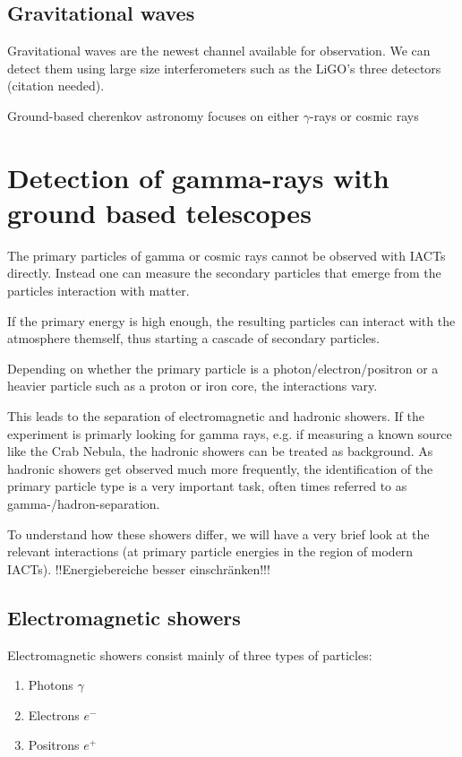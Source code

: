 \subsection{Gravitational waves}
Gravitational waves are the newest channel available for observation.
We can detect them using large size interferometers such as
the LiGO's three detectors (citation needed).



Ground-based cherenkov astronomy focuses on either $\gamma$-rays or cosmic rays


\section{Detection of gamma-rays with ground based telescopes}
The primary particles of gamma or cosmic rays cannot be 
observed with IACTs directly. Instead one can measure the secondary particles
that emerge from the particles interaction with matter.

If the primary energy is high enough, the resulting 
particles can interact with the atmosphere themself, thus starting a 
cascade of secondary particles.

Depending on whether the primary particle is 
a photon/electron/positron or a heavier particle such as a proton 
or iron core, the interactions vary.

This leads to the separation of electromagnetic and hadronic showers.
If the experiment is primarly looking for 
gamma rays, e.g. if measuring a known source like the Crab Nebula, 
the hadronic showers can be treated as background.
As hadronic showers get observed much more frequently, 
the identification of the primary particle type is a very important 
task, often times referred to as gamma-/hadron-separation.

To understand how these showers differ, we will have a very brief look
at the relevant interactions (at primary particle energies in the 
region of modern IACTs).
!!Energiebereiche besser einschränken!!!


\subsection{Electromagnetic showers}
Electromagnetic showers consist mainly of three types of particles:
\begin{enumerate}
	\item{Photons $\gamma$}
	\item{Electrons $e^-$}
	\item{Positrons $e^+$}
\end{enumerate}

